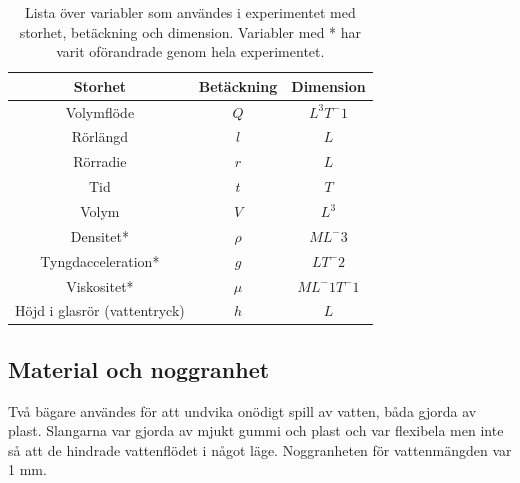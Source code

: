 \documentclass[a4paper,12pt]{article}
\begin{document}
\begin{table}
    \centering
    \begin{tabular}{|c|c|c|}
        \hline
            \textbf{Storhet} & \textbf{Betäckning} & \textbf{Dimension}\\ \hline
            Volymflöde & $Q$ & $L^3T^-1$\\ \hline
            Rörlängd & $l$ & $L$\\ \hline
            Rörradie & $r$ & $L$\\ \hline
            Tid & $t$ & $T$\\ \hline
            Volym & $V$ & $L^3$\\ \hline
            Densitet* & $\rho$ & $ML^-3$\\ \hline
            Tyngdacceleration* & $g$ & $LT^-2$\\ \hline
            Viskositet* & $\mu$ & $ML^-1T^-1$\\ \hline
            Höjd i glasrör (vattentryck) & $h$ & $L$\\ \hline
    \end{tabular}
    \caption{Lista över variabler som användes i experimentet med storhet, betäckning och dimension. Variabler med * har varit oförandrade genom hela experimentet.}
    \label{tab:Variabellista}
\end{table}
\subsection{Material och noggranhet}
    Två bägare användes för att undvika onödigt spill av vatten, båda gjorda av plast. Slangarna var gjorda av mjukt gummi och plast och var flexibela men inte så att de hindrade vattenflödet i något läge. Noggranheten för vattenmängden var 1 mm.
%
\end{document}
